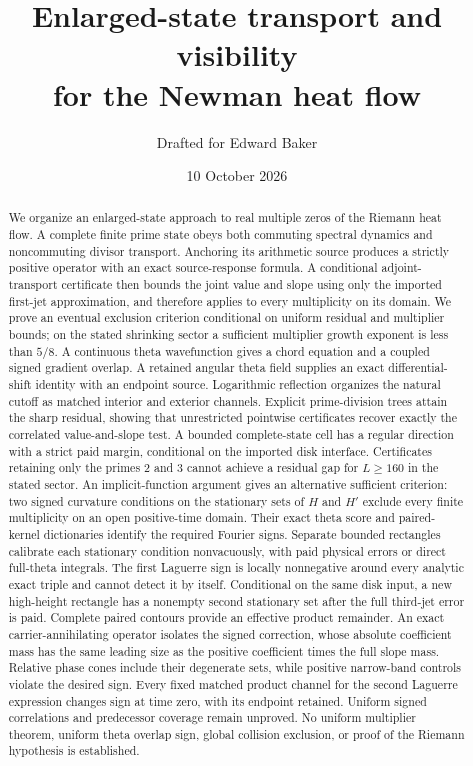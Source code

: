 \documentclass[11pt]{article}
\title{Enlarged-state transport and visibility\texorpdfstring{\\}{ }for the Newman heat flow}
\author{Drafted for Edward Baker}
\date{10 October 2026}
\theoremstyle{definition}
\theoremstyle{remark}
\begin{document}
\maketitle
\begin{abstract}
We organize an enlarged-state approach to real multiple zeros of the
Riemann heat flow. A complete finite prime state obeys both commuting
spectral dynamics and noncommuting divisor transport. Anchoring its
arithmetic source produces a strictly positive operator with an exact
source-response formula. A conditional adjoint-transport certificate then
bounds the joint value and slope using only the imported first-jet
approximation, and therefore applies to every multiplicity on its domain.
We prove an eventual exclusion criterion conditional on uniform residual
and multiplier bounds; on the stated shrinking sector a sufficient
multiplier growth exponent is less than $5/8$.
A continuous theta wavefunction gives a chord equation and a coupled
signed gradient overlap. A retained angular theta field supplies an exact
differential-shift identity with an endpoint source. Logarithmic reflection
organizes the natural cutoff as matched interior and exterior channels.
Explicit prime-division trees attain the sharp residual, showing that
unrestricted pointwise certificates recover exactly the correlated
value-and-slope test. A bounded complete-state cell has a regular
direction with a strict paid margin, conditional on the imported disk
interface. Certificates retaining only the primes 2 and 3 cannot achieve
a residual gap for $L\ge160$ in the stated sector.
An implicit-function argument gives an alternative sufficient criterion:
two signed curvature conditions on the stationary sets of $H$ and $H'$
exclude every finite multiplicity on an open positive-time domain.
Their exact theta score and paired-kernel dictionaries identify the
required Fourier signs. Separate bounded rectangles calibrate each
stationary condition nonvacuously, with paid physical errors or direct
full-theta integrals. The first Laguerre sign is locally nonnegative
around every analytic exact triple and cannot detect it by itself.
Conditional on the same disk input, a new high-height rectangle has a
nonempty second stationary set after the full third-jet error is paid. Complete paired contours provide
an effective product remainder. An exact carrier-annihilating operator
isolates the signed correction, whose absolute coefficient mass has the
same leading size as the positive coefficient times the full slope mass.
Relative phase cones include their degenerate sets, while positive
narrow-band controls violate the desired sign. Every fixed matched
product channel for the second Laguerre expression changes sign at time
zero, with its endpoint retained.
Uniform signed correlations and predecessor coverage remain unproved.
No uniform multiplier theorem, uniform theta overlap sign, global
collision exclusion, or proof of the Riemann hypothesis is established.
\end{abstract}
\end{document}
